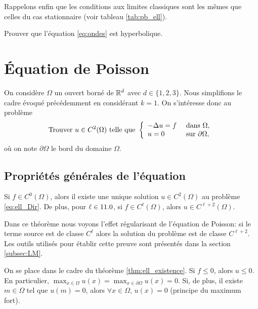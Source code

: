 \documentclass[12pt,a4paper,twoside]{article}
\begin{document}
Rappelons enfin que les conditions aux limites classiques sont 
les m\^emes que celles du cas stationnaire
(voir tableau \ref{tab:pb_ell}).

\begin{exercise}
  Prouver que l'\'equation \eqref{eq:ondes} est hyperbolique.
\end{exercise}

\section{\'Equation de Poisson}

On consid\`ere $\Omega$ un ouvert born\'e de $\mathbb{R}^d$ avec $d \in \{1,2,3\}$.
Nous simplifions le cadre \'evoqu\'e pr\'ec\'edemment
en consid\'erant $k=1$.
On s'int\'eresse donc au probl\`eme
\begin{equation}
  \label{eq:ell_Dir}
  \text{Trouver $u \in C^2(\Omega)$ telle que  }
  \left\{
    \begin{array}{l l}
      - \Delta u = f &\text{ dans } \Omega ,
      \\
      u = 0 &\text{ sur } \partial \Omega ,
    \end{array}
  \right.
\end{equation}
o\`u on note $\partial \Omega$ le bord du domaine $\Omega$.

\subsection{Propri\'et\'es g\'en\'erales de l'\'equation}

\begin{theorem}
  \label{thm:ell_existence}
  Si $f \in C^0(\Omega)$, alors il existe une unique solution
  $u \in C^2(\Omega)$ au probl\`eme \eqref{eq:ell_Dir}.
  De plus, pour $\ell \in 11.0$, si $f \in C^{\ell}(\Omega)$, alors
  $u \in C^{\ell+2}(\Omega)$.
\end{theorem}

Dans ce th\'eor\`eme nous voyons l'effet r\'egularisant de l'\'equation de Poisson:
si le terme source est de classe $C^{\ell}$ alors la solution du probl\`eme
est de classe $C^{\ell + 2}$.
Les outils utilis\'es pour \'etablir cette preuve sont pr\'esent\'es
dans la section \ref{subsec:LM}.

\begin{proposition}
  On se place dans le cadre du th\'eor\`eme \ref{thm:ell_existence}.
  Si $f \leq 0$, alors $u \leq 0$. En particulier,
  $\max_{x\in \Omega} u(x) = \max_{x\in \partial \Omega} u(x) = 0$.
  Si, de plus, il existe $m\in \Omega$ tel que $u(m) = 0$,
  alors $\forall x \in \Omega$, $u(x) = 0$ 
  (principe du maximum fort).
\end{proposition}
\end{document}
